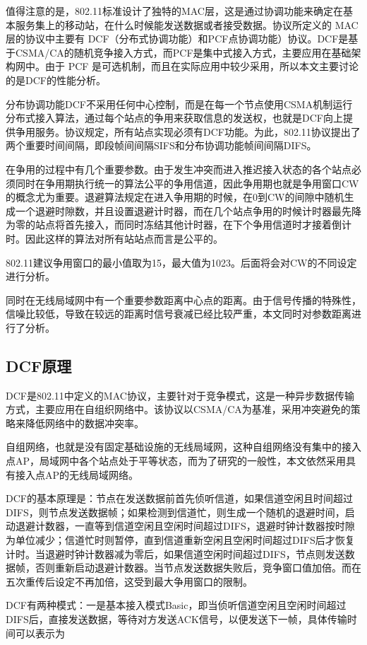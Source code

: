 \documentclass{article}
\begin{document}
值得注意的是，802.11标准设计了独特的MAC层，这是通过协调功能来确定在基本服务集上的移动站，在什么时候能发送数据或者接受数据。协议所定义的 MAC 层的协议中主要有 DCF（分布式协调功能）和PCF点协调功能）协议。DCF是基于CSMA/CA的随机竞争接入方式，而PCF是集中式接入方式，主要应用在基础架构网中。由于 PCF 是可选机制，而且在实际应用中较少采用，所以本文主要讨论的是DCF的性能分析。

分布协调功能DCF不采用任何中心控制，而是在每一个节点使用CSMA机制运行分布式接入算法，通过每个站点的争用来获取信息的发送权，也就是DCF向上提供争用服务。协议规定，所有站点实现必须有DCF功能。为此，802.11协议提出了两个重要时间间隔，即段帧间间隔SIFS和分布协调功能帧间间隔DIFS。

在争用的过程中有几个重要参数。由于发生冲突而进入推迟接入状态的各个站点必须同时在争用期执行统一的算法公平的争用信道，因此争用期也就是争用窗口CW的概念尤为重要。退避算法规定在进入争用期的时候，在0到CW的间隙中随机生成一个退避时隙数，并且设置退避计时器，而在几个站点争用的时候计时器最先降为零的站点将首先接入，而同时冻结其他计时器，在下个争用信道时才接着倒计时。因此这样的算法对所有站站点而言是公平的。

802.11建议争用窗口的最小值取为15，最大值为1023。后面将会对CW的不同设定进行分析。

同时在无线局域网中有一个重要参数距离中心点的距离。由于信号传播的特殊性，信噪比较低，导致在较远的距离时信号衰减已经比较严重，本文同时对参数距离进行了分析。

\subsection{DCF原理}
DCF是802.11中定义的MAC协议，主要针对于竞争模式，这是一种异步数据传输方式，主要应用在自组织网络中。该协议以CSMA/CA为基准，采用冲突避免的策略来降低网络中的数据冲突率。

自组网络，也就是没有固定基础设施的无线局域网，这种自组网络没有集中的接入点AP，局域网中各个站点处于平等状态，而为了研究的一般性，本文依然采用具有接入点AP的无线局域网络。

DCF的基本原理是：节点在发送数据前首先侦听信道，如果信道空闲且时间超过DIFS，则节点发送数据帧；如果检测到信道忙，则生成一个随机的退避时间，启动退避计数器，一直等到信道空闲且空闲时间超过DIFS，退避时钟计数器按时隙为单位减少；信道忙时则暂停，直到信道重新空闲且空闲时间超过DIFS后才恢复计时。当退避时钟计数器减为零后，如果信道空闲时间超过DIFS，节点则发送数据帧，否则重新启动退避计数器。当节点发送数据失败后，竞争窗口值加倍。而在五次重传后设定不再加倍，这受到最大争用窗口的限制。

DCF有两种模式：一是基本接入模式Basic，即当侦听信道空闲且空闲时间超过DIFS后，直接发送数据，等待对方发送ACK信号，以便发送下一帧，具体传输时间可以表示为
\end{document}
